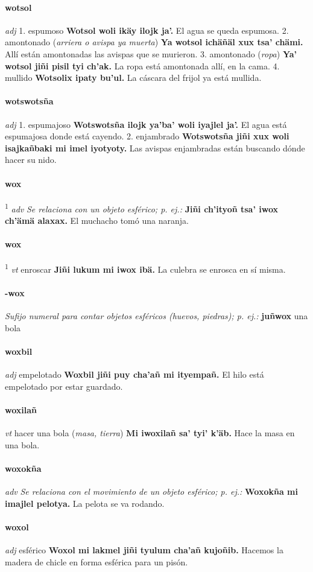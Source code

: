 \documentclass{scrbook}
\newcommand{\entry}[1]{\paragraph{#1}}
\newcommand{\onedefinition}[1]{#1.}
\newcommand{\defsuperscript}[1]{\textsuperscript{1}}
\newcommand{\nontranslationdef}[1]{\textit{#1}}
\newcommand{\partofspeech}[1]{\textit{#1}}
\newcommand{\spanishtranslation}[1]{#1}
\newcommand{\clarification}[1]{(\textit{#1})}
\newcommand{\cholexample}[1]{\textbf{#1}}
\newcommand{\exampletranslation}[1]{#1}
\begin{document}
\begin{multicols}{2}
\entry{wotsol}
\partofspeech{adj}
\onedefinition{1}
\spanishtranslation{espumoso}
\cholexample{Wotsol woli ikäy ilojk ja'.}
\exampletranslation{El agua se queda espumosa.}
\onedefinition{2}
\spanishtranslation{amontonado}
\clarification{arriera o avispa ya muerta}
\cholexample{Ya wotsol ichäñäl xux tsa' chämi.}
\exampletranslation{Allí están amontonadas las avispas que se murieron.}
\onedefinition{3}
\spanishtranslation{amontonado}
\clarification{ropa}
\cholexample{Ya' wotsol jiñi pisil tyi ch'ak.}
\exampletranslation{La ropa está amontonada allí, en la cama.}
\onedefinition{4}
\spanishtranslation{mullido}
\cholexample{Wotsolix ipaty bu'ul.}
\exampletranslation{La cáscara del frijol ya está mullida.}

\entry{wotswotsña}
\partofspeech{adj}
\onedefinition{1}
\spanishtranslation{espumajoso}
\cholexample{Wotswotsña ilojk ya'ba' woli iyajlel ja'.}
\exampletranslation{El agua está espumajosa donde está cayendo.}
\onedefinition{2}
\spanishtranslation{enjambrado}
\cholexample{Wotswotsña jiñi xux woli isajkañbaki mi imel iyotyoty.}
\exampletranslation{Las avispas enjambradas están buscando dónde hacer su nido.}

\entry{wox}
\defsuperscript{1}
\partofspeech{adv}
\nontranslationdef{Se relaciona con un objeto esférico; p. ej.:}
\cholexample{Jiñi ch'ityoñ tsa' iwox ch'ämä alaxax.}
\exampletranslation{El muchacho tomó una naranja.}

\entry{wox}
\defsuperscript{2}
\partofspeech{vt}
\spanishtranslation{enroscar}
\cholexample{Jiñi lukum mi iwox ibä.}
\exampletranslation{La culebra se enrosca en sí misma.}

\entry{-wox}
\nontranslationdef{Sufijo numeral para contar objetos esféricos (huevos, piedras); p. ej.:}
\cholexample{juñwox}
\exampletranslation{una bola}

\entry{woxbil}
\partofspeech{adj}
\spanishtranslation{empelotado}
\cholexample{Woxbil jiñi puy cha'añ mi ityempañ.}
\exampletranslation{El hilo está empelotado por estar guardado.}

\entry{woxilañ}
\partofspeech{vt}
\spanishtranslation{hacer una bola}
\clarification{masa, tierra}
\cholexample{Mi iwoxilañ sa' tyi' k'äb.}
\exampletranslation{Hace la masa en una bola.}

\entry{woxokña}
\partofspeech{adv}
\nontranslationdef{Se relaciona con el movimiento de un objeto esférico; p. ej.:}
\cholexample{Woxokña mi imajlel pelotya.}
\exampletranslation{La pelota se va rodando.}

\entry{woxol}
\partofspeech{adj}
\spanishtranslation{esférico}
\cholexample{Woxol mi lakmel jiñi tyulum cha'añ kujoñib.}
\exampletranslation{Hacemos la madera de chicle en forma esférica para un pisón.}


\end{multicols}
\end{document}
